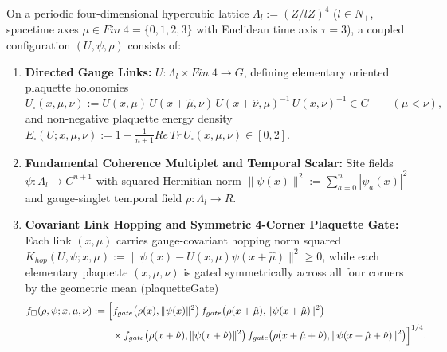 \documentclass[american,11pt,letterpaper]{article}
\def\mathbb#1{#1}%
\def\mathcal#1{#1}%
\def\mathrm#1{#1}%
\def\texttt#1{#1}%
\begin{document}
On a periodic four-dimensional hypercubic lattice $\Lambda_l := (\mathbb{Z}/l\mathbb{Z})^4$ ($l \in \mathbb{N}_+$, spacetime axes $\mu \in \mathrm{Fin}\;4 = \{0,1,2,3\}$ with Euclidean time axis $\tau = 3$), a coupled configuration $(U, \psi, \rho)$ consists of:
\begin{enumerate}[leftmargin=2em]
  \item \textbf{Directed Gauge Links:} $U : \Lambda_l \times \mathrm{Fin}\;4 \to G$, defining elementary oriented plaquette holonomies
  \begin{equation}
  U_\square(x,\mu,\nu) := U(x,\mu)\,U(x+\hat{\mu},\nu)\,U(x+\hat{\nu},\mu)^{-1}\,U(x,\nu)^{-1} \in G
  \qquad (\mu < \nu),
  \label{eq:plaquette_def_stage4}
  \end{equation}
  and non-negative plaquette energy density $E_\square(U; x,\mu,\nu) := 1 - \frac{1}{n+1}\mathrm{Re}\,\mathrm{Tr}\,U_\square(x,\mu,\nu) \in [0, 2]$.
  \item \textbf{Fundamental Coherence Multiplet and Temporal Scalar:} Site fields $\psi : \Lambda_l \to \mathbb{C}^{n+1}$ with squared Hermitian norm $\|\psi(x)\|^2 := \sum_{a=0}^n |\psi_a(x)|^2$ and gauge-singlet temporal field $\rho : \Lambda_l \to \mathbb{R}$.
  \item \textbf{Covariant Link Hopping and Symmetric 4-Corner Plaquette Gate:} Each link $(x,\mu)$ carries gauge-covariant hopping norm squared $\mathcal{K}_{\mathrm{hop}}(U,\psi;x,\mu) := \|\psi(x) - U(x,\mu)\psi(x+\hat{\mu})\|^2 \ge 0$, while each elementary plaquette $(x,\mu,\nu)$ is gated symmetrically across all four corners by the geometric mean (\texttt{plaquetteGate})
  \begin{equation}
  \begin{aligned}
  f_\square(\rho,\psi; x,\mu,\nu) &:= \Bigl[
    f_{\mathrm{gate}}\bigl(\rho(x),\|\psi(x)\|^2\bigr)\,
    f_{\mathrm{gate}}\bigl(\rho(x+\hat{\mu}),\|\psi(x+\hat{\mu})\|^2\bigr)\\
  &\qquad\times
    f_{\mathrm{gate}}\bigl(\rho(x+\hat{\nu}),\|\psi(x+\hat{\nu})\|^2\bigr)\,
    f_{\mathrm{gate}}\bigl(\rho(x+\hat{\mu}+\hat{\nu}),\|\psi(x+\hat{\mu}+\hat{\nu})\|^2\bigr)
  \Bigr]^{1/4}.
  \end{aligned}
  \label{eq:four_corner_plaquette_gate}
  \end{equation}
\end{enumerate}
\end{document}
